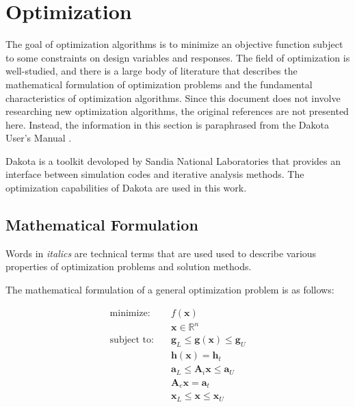\section{Optimization}
\label{sec:bg:opt}

The goal of optimization algorithms is to minimize an objective function subject to some constraints on design variables and responses.
The field of optimization is well-studied, and there is a large body of literature that describes the mathematical formulation of optimization problems and the fundamental characteristics of optimization algorithms.
Since this document does not involve researching new optimization algorithms, the original references are not presented here.
Instead, the information in this section is paraphrased from the Dakota User's Manual \cite{dakota}.

Dakota is a toolkit devoloped by Sandia National Laboratories that provides an interface between simulation codes and iterative analysis methods.
The optimization capabilities of Dakota are used in this work.

\subsection{Mathematical Formulation}
\label{sec:bg:opt:math}

Words in \textit{italics} are technical terms that are used used to describe various properties of optimization problems and solution methods.

The mathematical formulation of a general optimization problem is as follows:

\begin{equation}\begin{split}\label{eq:bg:opt:optimization_problem}
  \mbox{minimize:}  \quad & f\left(\textbf{x}\right) \\
                          & \textbf{x} \in \mathbb{R}^n \\
  \mbox{subject to:}\quad & \textbf{g}_L \leq \textbf{g}\left(\textbf{x}\right) \leq \textbf{g}_U \\
                          & \textbf{h}\left(\textbf{x}\right) = \textbf{h}_t \\
                          & \textbf{a}_L \leq \textbf{A}_i\textbf{x} \leq \textbf{a}_U \\
                          & \textbf{A}_e\textbf{x} = \textbf{a}_t \\
                          & \textbf{x}_L \leq \textbf{x} \leq \textbf{x}_U
\end{split}\end{equation}

